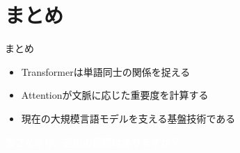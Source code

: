 \documentclass[aspectratio=169,professionalfonts]{beamer}
\begin{document}
\section{まとめ}

\begin{frame}{まとめ}
  \begin{itemize}
    \item Transformerは単語同士の関係を捉える
    \item Attentionが文脈に応じた重要度を計算する
    \item 現在の大規模言語モデルを支える基盤技術である
  \end{itemize}

  \begin{tcolorbox}[enhanced,
  colback=green!50!black,
  colframe=green!50!black,
  drop fuzzy shadow]
  \centering \large \bfseries
    \textcolor{white}{皆さんから，追加の質問はありますか？}
  \end{tcolorbox}
\end{frame}
\end{document}
